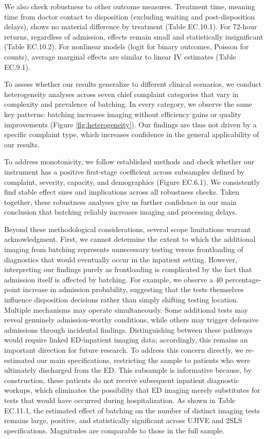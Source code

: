 \documentclass[,,blindrev]{informs}
\begin{document}
We also check robustness to other outcome measures. Treatment time,
meaning time from doctor contact to disposition (excluding waiting and
post-disposition delays), shows no material difference by treatment
(Table EC.10.1). For 72-hour returns, regardless of admission, effects
remain small and statistically insignificant (Table EC.10.2). For
nonlinear models (logit for binary outcomes, Poisson for counts),
average marginal effects are similar to linear IV estimates (Table
EC.9.1).

To assess whether our results generalize to different clinical
scenarios, we conduct heterogeneity analyses across seven chief
complaint categories that vary in complexity and prevalence of batching.
In every category, we observe the same key patterns: batching increases
imaging without efficiency gains or quality improvements (Figure
\ref{fig:heterogeneity}). Our findings are thus not driven by a specific
complaint type, which increases confidence in the general applicability
of our results.

To address monotonicity, we follow established methods and check whether
our instrument has a positive first-stage coefficient across subsamples
defined by complaint, severity, capacity, and demographics (Figure
EC.6.1). We consistently find stable effect sizes and implications
across all robustness checks. Taken together, these robustness analyses
give us further confidence in our main conclusion that batching reliably
increases imaging and processing delays.

Beyond these methodological considerations, several scope limitations
warrant acknowledgment. First, we cannot determine the extent to which
the additional imaging from batching represents unnecessary testing
versus frontloading of diagnostics that would eventually occur in the
inpatient setting. However, interpreting our findings purely as
frontloading is complicated by the fact that admission itself is
affected by batching. For example, we observe a 40 percentage-point
increase in admission probability, suggesting that the tests themselves
influence disposition decisions rather than simply shifting testing
location. Multiple mechanisms may operate simultaneously. Some
additional tests may reveal genuinely admission-worthy conditions, while
others may trigger defensive admissions through incidental findings.
Distinguishing between these pathways would require linked ED-inpatient
imaging data; accordingly, this remains an important direction for
future research. To address this concern directly, we re-estimated our
main specifications, restricting the sample to patients who were
ultimately discharged from the ED. This subsample is informative
because, by construction, these patients do not receive subsequent
inpatient diagnostic workups, which eliminates the possibility that ED
imaging merely substitutes for tests that would have occurred during
hospitalization. As shown in Table EC.11.1, the estimated effect of
batching on the number of distinct imaging tests remains large,
positive, and statistically significant across UJIVE and 2SLS
specifications. Magnitudes are comparable to those in the full sample.
\end{document}
